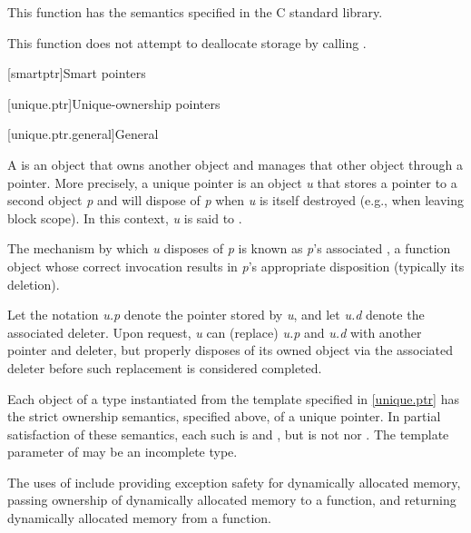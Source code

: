 \begin{itemdescr}
\pnum
\effects
This function has the semantics specified in the C standard library.

\pnum
\remarks
This function does not attempt to
deallocate storage by calling
.
\end{itemdescr}


[smartptr]{Smart pointers}

[unique.ptr]{Unique-ownership pointers}

[unique.ptr.general]{General}

\pnum
A  is an object that owns another object and
manages that other object through a pointer. More precisely, a unique pointer
is an object \textit{u} that stores a pointer to a second object \textit{p} and
will dispose of \textit{p} when \textit{u} is itself destroyed (e.g., when
leaving block scope). In this context, \textit{u} is said
to  .

\pnum
The mechanism by which \textit{u} disposes of \textit{p} is known as
\textit{p}'s associated , a function object whose correct
invocation results in \textit{p}'s appropriate disposition (typically its deletion).

\pnum
Let the notation \textit{u.p} denote the pointer stored by \textit{u}, and
let \textit{u.d} denote the associated deleter. Upon request, \textit{u} can
 (replace) \textit{u.p} and \textit{u.d} with another pointer and
deleter, but properly disposes of its owned object via the associated
deleter before such replacement is considered completed.

\pnum
Each object of a type  instantiated from the  template
specified in \ref{unique.ptr} has the strict ownership semantics, specified above,
of a unique pointer. In partial satisfaction of these semantics, each such 
is  and , but is not
 nor .
The template parameter  of  may be an incomplete type.

\pnum
\begin{note}
The uses
of  include providing exception safety for
dynamically allocated memory, passing ownership of dynamically allocated
memory to a function, and returning dynamically allocated memory from a
function.
\end{note}


